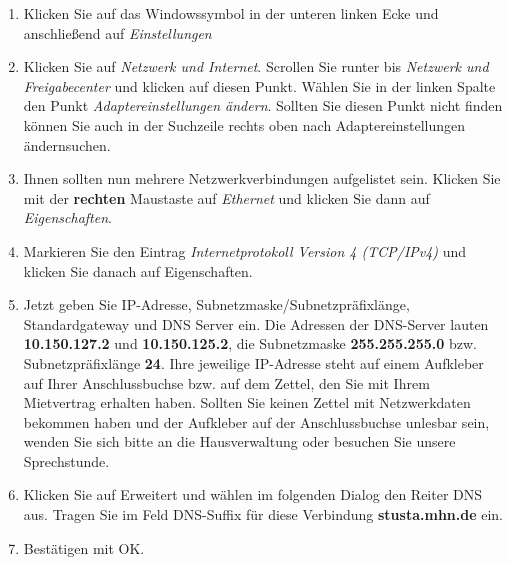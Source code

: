 \documentclass[a4paper,12pt]{scrartcl}
\begin{document}
\begin{enumerate}
	\item Klicken Sie auf das Windowssymbol in der unteren linken Ecke und anschließend auf \emph{Einstellungen}
	\item Klicken Sie auf \textit{Netzwerk und Internet}. Scrollen Sie runter bis \textit{Netzwerk und Freigabecenter} und klicken auf diesen Punkt. Wählen Sie in der linken Spalte den Punkt \textit{Adaptereinstellungen ändern}. Sollten Sie diesen Punkt nicht finden können Sie auch in der Suchzeile rechts oben nach \glqq Adaptereinstellungen ändern\grqq suchen.

    \item Ihnen sollten nun mehrere Netzwerkverbindungen aufgelistet sein. Klicken Sie mit der \textbf{rechten} Maustaste auf \textit{Ethernet} und klicken Sie dann auf \textit{Eigenschaften}.
    \item Markieren Sie den Eintrag \textit{Internetprotokoll Version 4 (TCP/IPv4)} und klicken Sie danach auf Eigenschaften.
    \item Jetzt geben Sie IP-Adresse, Subnetzmaske/Subnetzpräfixlänge, Standardgateway und DNS Server ein. Die Adressen der DNS-Server lauten \textbf{10.150.127.2} und \textbf{10.150.125.2}, die Subnetzmaske \textbf{255.255.255.0} bzw. Subnetzpräfixlänge \textbf{24}. Ihre jeweilige IP-Adresse steht auf einem Aufkleber auf Ihrer Anschlussbuchse bzw. auf dem Zettel, den Sie mit Ihrem Mietvertrag erhalten haben. Sollten Sie keinen Zettel mit Netzwerkdaten bekommen haben und der Aufkleber auf der Anschlussbuchse unlesbar sein, wenden Sie sich bitte an die Hausverwaltung oder besuchen Sie unsere Sprechstunde.
    \item Klicken Sie auf Erweitert und wählen im folgenden Dialog den Reiter DNS aus. Tragen Sie im Feld DNS-Suffix für diese Verbindung \textbf{stusta.mhn.de} ein.
    \item Bestätigen mit OK.
\end{enumerate}
\end{document}
